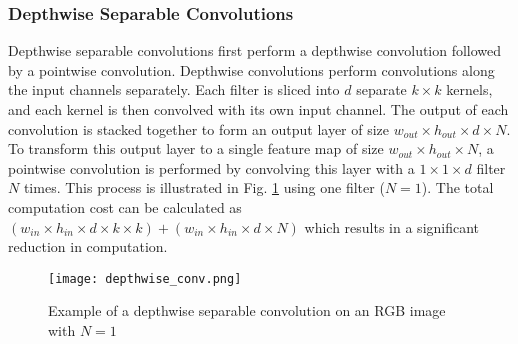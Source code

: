 \documentclass[conference]{IEEEtran}
\begin{document}
\subsubsection{Depthwise Separable Convolutions}
Depthwise separable convolutions \cite{sifre2014rigid} first perform a depthwise convolution followed by a pointwise convolution. Depthwise convolutions perform convolutions along the input channels separately. Each filter is sliced into $d$ separate $k \times k$ kernels, and each kernel is then convolved with its own input channel. The output of each convolution is stacked together to form an output layer of size $w_{out} \times h_{out} \times d \times N$. To transform this output layer to a single feature map of size $w_{out} \times h_{out} \times N$, a pointwise convolution is performed by convolving this layer with a $1\times1 \times d$ filter $N$ times. This process is illustrated in Fig. \ref{fig:depthsepconv} using one filter ($N=1$). The total computation cost can be calculated as $(w_{in} \times h_{in} \times d \times k \times k) + (w_{in} \times h_{in} \times d \times N)$ which results in a significant reduction in computation.

\begin{figure}[b!]
\begin{center}
\texttt{[image: depthwise\_conv.png]}
\end{center}
\caption{Example of a depthwise separable convolution on an RGB image with $N=1$}
\label{fig:depthsepconv}
\end{figure}
\end{document}

